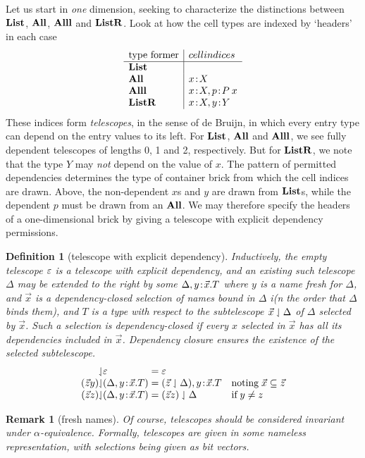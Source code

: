 \documentclass{article}
\newtheorem{defn}[thm]{Definition}
\newtheorem{rem}{Remark}[thm]
\begin{document}
Let us start in \emph{one} dimension, seeking to characterize the distinctions between $\mathbf{List}$, $\mathbf{All}$, $\mathbf{Alll}$ and $\mathbf{ListR}$. Look at how the cell types are indexed by `headers' in each case
\[\begin{array}{l|l}
\mbox{type former} & cell indices \\
\hline
\Li & \\
\All & x\hb X \\
\Alll & x\hb X, p\hb P\:x \\
\ListR & x\hb X, y\hb Y
\end{array}\]
These indices form \emph{telescopes}, in the sense of de Bruijn, in which every entry type can depend on the entry values to its left. For $\mathbf{List}$, $\mathbf{All}$ and $\mathbf{Alll}$, we see fully dependent telescopes of lengths 0, 1 and 2, respectively. But for $\mathbf{ListR}$, we note that the type $Y$ may \emph{not} depend on the value of $x$. The pattern of permitted dependencies determines the type of container brick from which the cell indices are drawn. Above, the non-dependent $x$s and $y$ are drawn from $\mathbf{List}$s, while the dependent $p$ must be drawn from an $\mathbf{All}$. We may therefore specify the headers of a one-dimensional brick by giving a telescope with explicit dependency permissions.

\begin{defn}[telescope with explicit dependency]
  Inductively, the empty telescope $\varepsilon$ is a telescope with explicit dependency, and an existing such telescope $\Delta$ may be extended to the right by some $\Delta,y\!:\!\vec x.T$ where $y$ is a name fresh for $\Delta$, and $\vec x$ is a dependency-closed selection of names bound in $\Delta$ i(n the order that $\Delta$ binds them), and $T$ is a type with respect to the subtelescope $\vec x\downharpoonleft\Delta$ of $\Delta$ selected by $\vec x$. Such a selection is dependency-closed if every $x$ selected in $\vec x$ has all its dependencies included in $\vec x$. Dependency closure ensures the existence of the selected subtelescope.
  \[
  \begin{array}{r@{\sel}l@{\;=\;}ll}
    \;&\emp & \emp \\
    (\vec z y)&(\Delta,y\hb\vec x.T) & (\vec z\sel\Delta),y\hb\vec x.T
    &\mbox{noting}\;\vec x \subseteq \vec z\\
    (\vec z z)&(\Delta,y\hb\vec x.T) & (\vec z z)\sel\Delta &\mbox{if}\;y\neq z \\
    \end{array}
  \]
\end{defn}

\begin{rem}[fresh names]
  Of course, telescopes should be considered invariant under $\alpha$-equivalence. Formally, telescopes are given in some nameless representation, with selections being given as bit vectors.
\end{rem}
\end{document}
